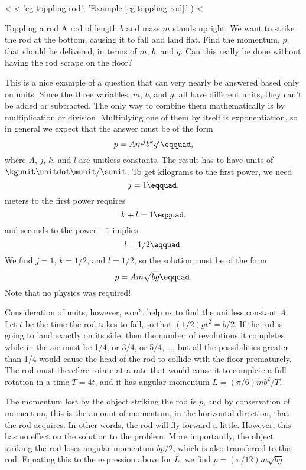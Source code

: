 <%
<%
    'eg-toppling-rod',
    'Example \ref{eg:toppling-rod}.'
  )
<%
\begin{eg}{Toppling a rod}\label{eg:toppling-rod}
\egquestion A rod of length $b$ and mass $m$ stands upright. We want
to strike the rod at the bottom, causing it to fall and land flat.
Find the momentum, $p$, that should be delivered, in terms of $m$, $b$,
and $g$. Can this really be done without having the rod scrape on the floor?

\eganswer This is a nice example of a question that can very nearly be
answered based only on units. Since the three variables, $m$, $b$,
and $g$, all have different units, they can't be added or subtracted.
The only way to combine them mathematically is by multiplication or division.
Multiplying one of them by itself is exponentiation, so in general
we expect that the answer must be of the form
\begin{equation*}
  p = A m^j b^k g^l\eqquad,
\end{equation*}
where $A$, $j$, $k$, and $l$ are unitless constants. The result has
to have units of $\kgunit\unitdot\munit/\sunit$. To get kilograms to
the first power, we need
\begin{equation*}
  j=1\eqquad,
\end{equation*}
meters to the first power requires
\begin{equation*}
  k+l=1\eqquad,
\end{equation*}
and
seconds to the power $-1$ implies
\begin{equation*}
  l=1/2\eqquad.
\end{equation*}
We find $j=1$, $k=1/2$, and $l=1/2$, so the solution must be of the form
\begin{equation*}
  p = A m\sqrt{bg}\eqquad.
\end{equation*}
Note that no physics was required!

Consideration of units, however, won't help us to find the unitless constant
$A$. Let $t$ be the time the rod takes to fall, so that $(1/2)gt^2=b/2$.
If the rod is going to land exactly on its side, then the number of revolutions
it completes while in the air must be 1/4, or 3/4, or 5/4,  \ldots, but all the
possibilities greater than 1/4 would cause the head of the rod to collide with
the floor prematurely. The rod must therefore rotate at a rate that would
cause it to complete a full rotation in a time $T=4t$, and it has angular
momentum $L=(\pi/6)mb^2/T$.

The momentum lost by the object striking
the rod is $p$, and by conservation of momentum, this is the amount of
momentum, in the horizontal direction, that the rod acquires. In other words,
the rod will fly forward a little. However, this has no effect on the solution
to the problem. More importantly, the object striking the rod loses angular
momentum $bp/2$, which is also transferred to the rod. Equating this to the
expression above for $L$, we find $p=(\pi/12)m\sqrt{bg}$.


\end{eg}
